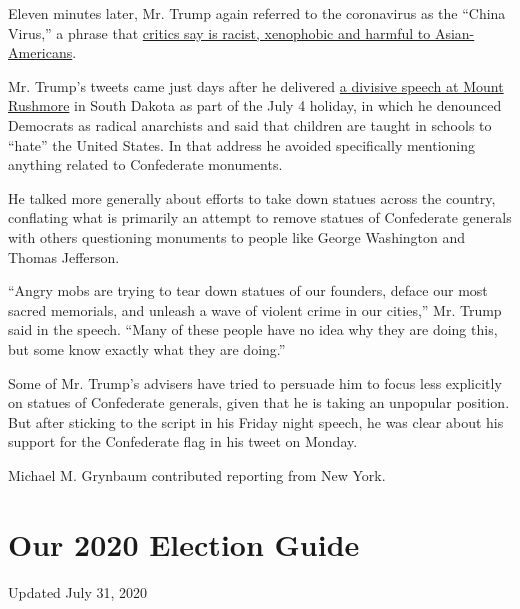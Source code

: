 Eleven minutes later, Mr. Trump again referred to the coronavirus as the
``China Virus,'' a phrase that
\href{https://www.nytimes.com/2020/03/18/us/politics/china-virus.html}{critics
say is racist, xenophobic and harmful to Asian-Americans}.

Mr. Trump's tweets came just days after he delivered
\href{https://www.nytimes.com/2020/07/03/us/politics/trump-coronavirus-mount-rushmore.html?action=click\&module=RelatedLinks\&pgtype=Article}{a
divisive speech at Mount Rushmore} in South Dakota as part of the July 4
holiday, in which he denounced Democrats as radical anarchists and said
that children are taught in schools to ``hate'' the United States. In
that address he avoided specifically mentioning anything related to
Confederate monuments.

He talked more generally about efforts to take down statues across the
country, conflating what is primarily an attempt to remove statues of
Confederate generals with others questioning monuments to people like
George Washington and Thomas Jefferson.

``Angry mobs are trying to tear down statues of our founders, deface our
most sacred memorials, and unleash a wave of violent crime in our
cities,'' Mr. Trump said in the speech. ``Many of these people have no
idea why they are doing this, but some know exactly what they are
doing.''

Some of Mr. Trump's advisers have tried to persuade him to focus less
explicitly on statues of Confederate generals, given that he is taking
an unpopular position. But after sticking to the script in his Friday
night speech, he was clear about his support for the Confederate flag in
his tweet on Monday.

Michael M. Grynbaum contributed reporting from New York.

\hypertarget{our-2020-election-guide}{%
\section{Our 2020 Election Guide}\label{our-2020-election-guide}}

Updated July 31, 2020


